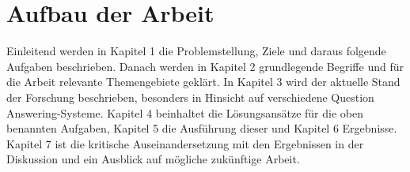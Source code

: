 \section{Aufbau der Arbeit}

Einleitend werden in Kapitel 1 die Problemstellung, Ziele und daraus folgende Aufgaben beschrieben.
Danach werden in Kapitel 2 grundlegende Begriffe und für die Arbeit relevante Themengebiete geklärt.
In Kapitel 3 wird der aktuelle Stand der Forschung beschrieben, besonders in Hinsicht auf verschiedene Question Answering-Systeme.
Kapitel 4 beinhaltet die Lösungsansätze für die oben benannten Aufgaben, Kapitel 5 die Ausführung dieser und Kapitel 6 Ergebnisse.
Kapitel 7 ist die kritische Auseinandersetzung mit den Ergebnissen in der Diskussion und ein Ausblick auf mögliche zukünftige Arbeit.
